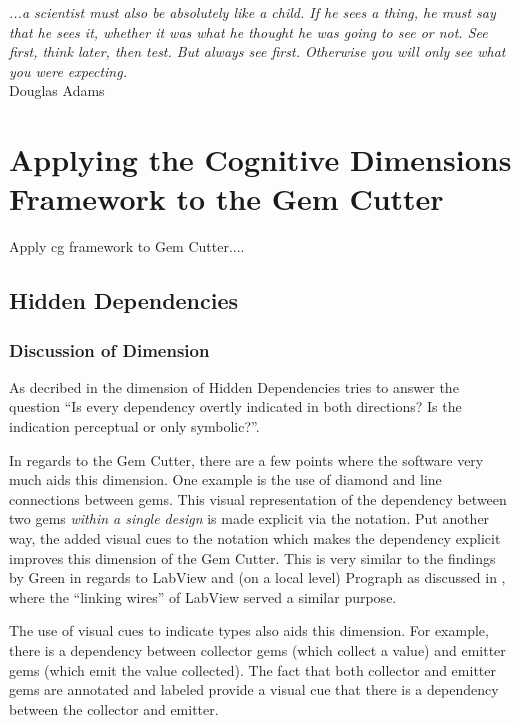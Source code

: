 \label{chapter:Exp}

\begin{flushright}
\textit{...a scientist must also be absolutely like a child.  If he sees a thing, he must say that he sees it, whether it was what he thought he was going to see or not.  See first, think later, then test.  But always see first.  Otherwise you will only see what you were expecting.}
\\
Douglas Adams \cite{Adams84} \\
\end{flushright}

\section{Applying the Cognitive Dimensions Framework to the Gem Cutter}

Apply cg framework to Gem Cutter....

\subsection{Hidden Dependencies}

\subsubsection{Discussion of Dimension}

As decribed in  the dimension of Hidden Dependencies tries to answer the question ``Is every dependency overtly indicated in both directions? Is the indication perceptual or only symbolic?''.

In regards to the Gem Cutter, there are a few points where the software very much aids this dimension.  One example is the use of diamond and line connections between gems.  This visual representation of the dependency between two gems \emph{within a single design} is made explicit via the notation.  Put another way, the added visual cues to the notation which makes the dependency explicit improves this dimension of the Gem Cutter.  This is very similar to the findings by Green in regards to LabView and (on a local level) Prograph as discussed in , where the ``linking wires'' of LabView served a similar purpose.

The use of visual cues to indicate types also aids this dimension.  For example, there is a dependency between collector gems (which collect a value) and emitter gems (which emit the value collected).  The fact that both collector and emitter gems are annotated and labeled provide a visual cue that there is a dependency between the collector and emitter.

